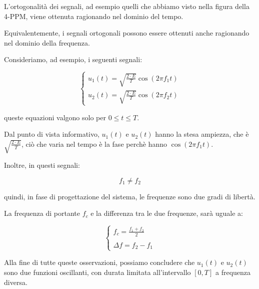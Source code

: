 L'ortogonalità dei segnali, ad esempio quelli che abbiamo visto nella figura della 4-PPM, 
viene ottenuta ragionando nel dominio del tempo. \newline 

Equivalentemente, i segnali ortogonali possono essere ottenuti anche ragionando nel dominio della frequenza. \newline 

Consideriamo, ad esempio, i seguenti segnali: 

{
    \Large 
    \begin{equation}
        \begin{cases}
            u_1 (t) = \sqrt{\frac{2 \cdot E}{T}} \cos(2 \pi f_1 t)
            \\
            u_2 (t) = \sqrt{\frac{2 \cdot E}{T}} \cos(2 \pi f_2 t)
        \end{cases}
    \end{equation}
}

queste equazioni valgono solo per $0 \le t \le T$. \newline 

Dal punto di vista informativo, $u_1 (t)$ e $u_2 (t)$ hanno la stesa ampiezza, 
che è $\sqrt{\frac{2 \cdot E}{T}}$, 
ciò che varia nel tempo è la fase perchè hanno $\cos(2 \pi f_1 t)$. \newline 

Inoltre, in questi segnali: 

{
    \Large 
    \begin{equation}
        f_1 \neq f_2
    \end{equation}
}

quindi, in fase di progettazione del sistema, le frequenze sono due gradi di libertà. \newline 

La frequenza di portante $f_c$ e la differenza tra le due frequenze, sarà uguale a: 

{
    \Large 
    \begin{equation}
        \begin{cases}
            f_c = \frac{f_1 + f_2}{2}
            \\
            \quad
            \\
            \Delta f = f_2 - f_1
        \end{cases}
    \end{equation}
}

Alla fine di tutte queste osservazioni, 
possiamo concludere che $u_1 (t)$ e $u_2 (t)$ sono due funzioni oscillanti, 
con durata limitata all'intervallo $[0, T]$ a frequenza diversa. \newline 

